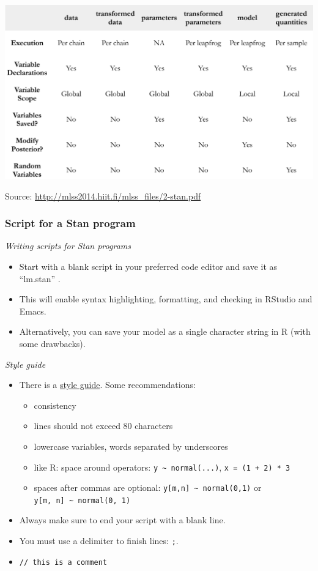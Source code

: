 \documentclass[
  11pt,
]{article}
\providecommand{\tightlist}{%
  \setlength{\itemsep}{0pt}\setlength{\parskip}{0pt}}
\begin{document}
\begin{center}\includegraphics[width=0.72\linewidth]{images/blocks} \end{center}

Source: \url{http://mlss2014.hiit.fi/mlss_files/2-stan.pdf}

\hypertarget{script-for-a-stan-program}{%
\subsubsection{Script for a Stan program}\label{script-for-a-stan-program}}

\emph{Writing scripts for Stan programs}

\begin{itemize}
\tightlist
\item
  Start with a blank script in your preferred code editor and save it as ``lm.stan'' .
\item
  This will enable syntax highlighting, formatting, and checking in RStudio and Emacs.
\item
  Alternatively, you can save your model as a single character string in R (with some drawbacks).
\end{itemize}

\emph{Style guide}

\begin{itemize}
\tightlist
\item
  There is a \href{https://mc-stan.org/docs/2_26/stan-users-guide/stan-program-style-guide.html}{style guide}. Some recommendations:

  \begin{itemize}
  \tightlist
  \item
    consistency
  \item
    lines should not exceed 80 characters
  \item
    lowercase variables, words separated by underscores
  \item
    like R: space around operators: \texttt{y\ \textasciitilde{}\ normal(...)}, \texttt{x\ =\ (1\ +\ 2)\ *\ 3}
  \item
    spaces after commas are optional: \texttt{y{[}m,n{]}\ \textasciitilde{}\ normal(0,1)} or \texttt{y{[}m,\ n{]}\ \textasciitilde{}\ normal(0,\ 1)}
  \end{itemize}
\item
  Always make sure to end your script with a blank line.
\item
  You must use a delimiter to finish lines: \texttt{;}.
\item
  \texttt{//\ this\ is\ a\ comment}
\end{itemize}
\end{document}
